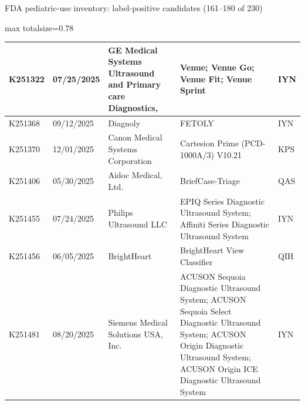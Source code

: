 \documentclass[aspectratio=169]{beamer}
\begin{document}
\begin{frame}[category=FDA appendix]{FDA pediatric-use inventory: label-positive candidates (161--180 of 230)}
\begin{adjustbox}{max totalsize={\textwidth}{0.78\textheight}}
\begin{tabular}{|p{}|p{}|p{}|p{}|p{}|}
K251322 & 07/25/2025 & GE Medical Systems Ultrasound and Primary care Diagnostics, & Venue; Venue Go; Venue Fit; Venue Sprint & IYN \\ \hline
K251368 & 09/12/2025 & Diagnoly & FETOLY & IYN \\ \hline
K251370 & 12/01/2025 & Canon Medical Systems Corporation & Cartesion Prime (PCD-1000A/3) V10.21 & KPS \\ \hline
K251406 & 05/30/2025 & Aidoc Medical, Ltd. & BriefCase-Triage & QAS \\ \hline
K251455 & 07/24/2025 & Philips Ultrasound LLC & EPIQ Series Diagnostic Ultrasound System; Affiniti Series Diagnostic Ultrasound System & IYN \\ \hline
K251456 & 06/05/2025 & BrightHeart & BrightHeart View Classifier & QIH \\ \hline
K251481 & 08/20/2025 & Siemens Medical Solutions USA, Inc. & ACUSON Sequoia Diagnostic Ultrasound System; ACUSON Sequoia Select Diagnostic Ultrasound System; ACUSON Origin Diagnostic Ultrasound System; ACUSON Origin ICE Diagnostic Ultrasound System & IYN \\ \hline
\end{tabular}
\end{adjustbox}
\end{frame}
\end{document}
